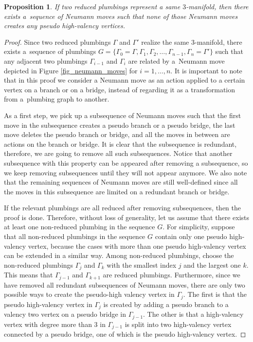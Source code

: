 \documentclass[pdftex]{sigma}
\numberwithin{equation}{section}
\newtheorem{Proposition}[Theorem]{Proposition}
\begin{document}
\begin{Proposition}\label{proposition_relation_reduced_plumbings}
If two reduced plumbings represent a same $3$-manifold, then there exists a~sequence of Neumann moves such that none of those Neumann moves creates any pseudo high-valency vertices.
\end{Proposition}
\begin{proof}
Since two reduced plumbings $\Gamma$ and $\Gamma'$ realize the same 3-manifold, there exists a~sequence of plumbings $G=\{\Gamma_0=\Gamma, \Gamma_1, \Gamma_2, \dots, \Gamma_{n-1}, \Gamma_n=\Gamma'\}$ such that any adjacent two plumbings $\Gamma_{i-1}$ and $\Gamma_i$ are related by a~Neumann move depicted in Figure \ref{fig_neumann_moves} for $i=1, \dots, n$. It is important to note that in this proof we consider a Neumann move as an action applied to a certain vertex on a branch or on a bridge, instead of regarding it as a transformation from a~plumbing graph to another.
	
As a first step, we pick up a subsequence of Neumann moves such that the first move in the subsequence creates a pseudo branch or a pseudo bridge, the last move deletes the pseudo branch or bridge, and all the moves in between are actions on the branch or bridge. It is clear that the subsequence is redundant, therefore, we are going to remove all such subsequences. Notice that another subsequence with this property can be appeared after removing a subsequence, so we keep removing subsequences until they will not appear anymore. We also note that the remaining sequences of Neumann moves are still well-defined since all the moves in this subsequence are limited on a redundant branch or bridge.
	
If the relevant plumbings are all reduced after removing subsequences, then the proof is done. Therefore, without loss of generality, let us assume that there exists at least one non-reduced plumbing in the sequence $G$. For simplicity, suppose that all non-reduced plumbings in the sequence $G$ contain only one pseudo high-valency vertex, because the cases with more than one pseudo high-valency vertex can be extended in a similar way. Among non-reduced plumbings, choose the non-reduced plumbings $\Gamma_j$ and $\Gamma_k$ with the smallest index $j$ and the largest one $k$. This means that $\Gamma_{j-1}$ and $\Gamma_{k+1}$ are reduced plumbings. Furthermore, since we have removed all redundant subsequences of Neumann moves, there are only two possible ways to create the pseudo-high valency vertex in $\Gamma_j$. The first is that the pseudo high-valency vertex in $\Gamma_j$ is created by adding a pseudo branch to a valency two vertex on a pseudo bridge in $\Gamma_{j-1}$. The other is that a high-valency vertex with degree more than 3 in $\Gamma_{j-1}$ is split into two high-valency vertex connected by a pseudo bridge, one of which is the pseudo high-valency vertex.
	

\end{proof}
\end{document}
